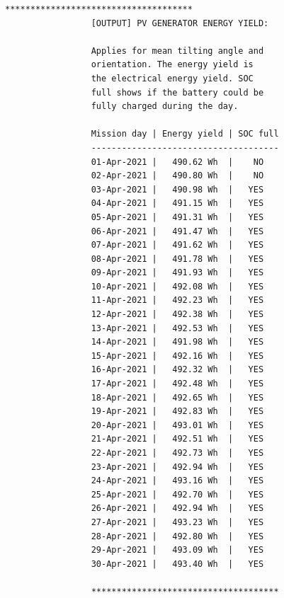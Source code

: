 \begin{lstfloat}
\begin{lstlisting}[keywordstyle=\color{black}, numbers = none, caption = {Output of the \MATLAB simulation in appendix \ref{sec:matlab_code} regarding the daily energy yield of the PV generator for the mission inputs in the table \ref{tab:table_vienna}.}, label = lst:list_negev_4, captionpos = b]
                 *************************************
                 [OUTPUT] PV GENERATOR ENERGY YIELD:

                 Applies for mean tilting angle and
                 orientation. The energy yield is 
                 the electrical energy yield. SOC
                 full shows if the battery could be
                 fully charged during the day.

                 Mission day | Energy yield | SOC full
                 -------------------------------------
                 01-Apr-2021 |   490.62 Wh  |    NO   
                 02-Apr-2021 |   490.80 Wh  |    NO   
                 03-Apr-2021 |   490.98 Wh  |   YES   
                 04-Apr-2021 |   491.15 Wh  |   YES   
                 05-Apr-2021 |   491.31 Wh  |   YES   
                 06-Apr-2021 |   491.47 Wh  |   YES   
                 07-Apr-2021 |   491.62 Wh  |   YES   
                 08-Apr-2021 |   491.78 Wh  |   YES   
                 09-Apr-2021 |   491.93 Wh  |   YES   
                 10-Apr-2021 |   492.08 Wh  |   YES   
                 11-Apr-2021 |   492.23 Wh  |   YES   
                 12-Apr-2021 |   492.38 Wh  |   YES   
                 13-Apr-2021 |   492.53 Wh  |   YES   
                 14-Apr-2021 |   491.98 Wh  |   YES   
                 15-Apr-2021 |   492.16 Wh  |   YES   
                 16-Apr-2021 |   492.32 Wh  |   YES   
                 17-Apr-2021 |   492.48 Wh  |   YES   
                 18-Apr-2021 |   492.65 Wh  |   YES   
                 19-Apr-2021 |   492.83 Wh  |   YES   
                 20-Apr-2021 |   493.01 Wh  |   YES   
                 21-Apr-2021 |   492.51 Wh  |   YES   
                 22-Apr-2021 |   492.73 Wh  |   YES   
                 23-Apr-2021 |   492.94 Wh  |   YES   
                 24-Apr-2021 |   493.16 Wh  |   YES   
                 25-Apr-2021 |   492.70 Wh  |   YES   
                 26-Apr-2021 |   492.94 Wh  |   YES   
                 27-Apr-2021 |   493.23 Wh  |   YES   
                 28-Apr-2021 |   492.80 Wh  |   YES   
                 29-Apr-2021 |   493.09 Wh  |   YES   
                 30-Apr-2021 |   493.40 Wh  |   YES   

                 *************************************
\end{lstlisting}
\end{lstfloat}
